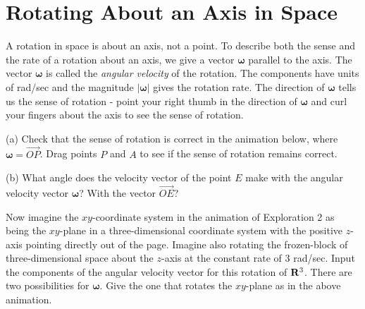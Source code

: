 \documentclass{ximera}
\begin{document}


\section{Rotating About an Axis in Space}
A rotation in space is about an axis, not a point. To describe both the sense and the rate of a rotation about an axis, we give a vector $\boldsymbol{\omega}$ parallel to the axis. The vector $\boldsymbol{\omega}$ is called the \emph{angular velocity} of the rotation. The components have units of rad/sec and the magnitude $|\boldsymbol{\omega}|$ gives the rotation rate. The direction of $\boldsymbol{\omega}$ tells us the sense of rotation - point your right thumb in the direction of $\boldsymbol{\omega}$ and curl your fingers about the axis to see the sense of rotation.

\begin{exploration}

(a) Check that the sense of rotation is correct in the animation below, where $\boldsymbol{\omega} = \overrightarrow{OP}$. Drag points $P$ and $A$ to see if the sense of rotation remains correct.

(b) What angle does the velocity vector of the point $E$ make with the angular velocity vector $\boldsymbol{\omega}$? With the vector ${\overrightarrow{OE}}$?


 
\begin{onlineOnly}
    \begin{center}
\end{center}
\end{onlineOnly}

\end{exploration}



Now imagine the $xy$-coordinate system in the animation of Exploration 2 as being the $xy$-plane in a three-dimensional coordinate system with the positive $z$-axis pointing directly out of the page. Imagine also rotating the frozen-block of three-dimensional space about the $z$-axis at the constant rate of $3$ rad/sec. Input the components of the angular velocity vector for this rotation of ${\bf R}^3$. There are two possibilities for $\boldsymbol{\omega}$. Give the one that rotates the $xy$-plane as in the above animation. 
\end{document}
